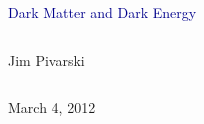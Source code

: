 \documentclass[compress]{beamer}
\begin{document}
\begin{frame}
\vfill
\begin{center}
\textcolor{darkblue}{\Large Dark Matter and Dark Energy}

\vfill
\begin{columns}
\begin{center}
\large
Jim Pivarski
\end{center}
\end{columns}


\vfill
March 4, 2012

\end{center}
\end{frame}


\small



\end{document}
